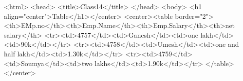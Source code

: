 <html>
<head>
<title>Class14</title>
</head>
<body>
<h1 align="center">Table</h1></center>
<center><table border="2">
<th>EMp.no</th><th>Emp.Name</th><th>Emp.Salary</th><th>net salary</th>
<tr><td>4757</td><td>Ganesh</td><td>one lakh</td><td>90k</td></tr>
<tr><td>4758</td><td>Umesh</td><td>one and half lakh</td><td>1.30k</td></tr>
<tr><td>4759</td><td>Soumya</td><td>two lakhs</td><td>1.90k</td></tr>
</table></center>

